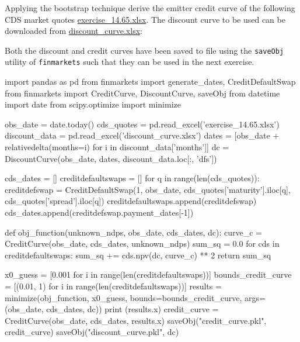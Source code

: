 \cprotEnv\begin{question}
Applying the bootstrap technique derive the emitter credit curve of the following CDS market quotes
\href{https://github.com/matteosan1/finance_course/raw/master/input_files/exercise_14.65.xlsx}{exercise\_14.65.xlsx}.
The discount curve to be used can be downloaded from  \href{https://github.com/matteosan1/finance_course/raw/master/input_files/discount_curve.xlsx}{discount\_curve.xlsx}:
\end{question}

\cprotEnv\begin{solution}

Both the discount and credit curves have been saved to file using the \texttt{saveObj} utility of \texttt{finmarkets} such that they can be used in the next exercise.

\begin{ipython}
import pandas as pd
from finmarkets import generate_dates, CreditDefaultSwap
from finmarkets import CreditCurve, DiscountCurve, saveObj
from datetime import date
from scipy.optimize import minimize

obs_date = date.today()
cds_quotes = pd.read_excel('exercise_14.65.xlsx')
discount_data = pd.read_excel('discount_curve.xlsx')
dates = [obs_date + relativedelta(months=i) for i in discount_data['months']]
dc = DiscountCurve(obs_date, dates, discount_data.loc[:, 'dfs'])

cds_dates = []
creditdefaultswaps = []
for q in range(len(cds_quotes)):
    creditdefswap = CreditDefaultSwap(1, obs_date, 
                                      cds_quotes['maturity'].iloc[q], 
                                      cds_quotes['spread'].iloc[q])
    creditdefaultswaps.append(creditdefswap)
    cds_dates.append(creditdefswap.payment_dates[-1])
    
def obj_function(unknown_ndps, obs_date, cds_dates, dc):
    curve_c = CreditCurve(obs_date, cds_dates, unknown_ndps)
    sum_sq = 0.0
    for cds in creditdefaultswaps:
        sum_sq += cds.npv(dc, curve_c) ** 2
    return sum_sq

x0_guess = [0.001 for i in range(len(creditdefaultswaps))]
bounds_credit_curve = [(0.01, 1) for i in range(len(creditdefaultswaps))]
results = minimize(obj_function, x0_guess, bounds=bounds_credit_curve,
                   args=(obs_date, cds_dates, dc))
print (results.x)
credit_curve = CreditCurve(obs_date, cds_dates, results.x)
saveObj("credit_curve.pkl", credit_curve)
saveObj("discount_curve.pkl", dc)
\end{ipython}
\begin{ioutput}
[0.90641296 0.80370758 0.70836204 0.49555918 0.29156774 0.06680166]
\end{ioutput}
\end{solution}

